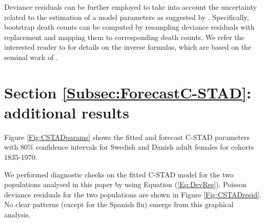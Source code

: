 \documentclass[11pt, a4paper]{article}
\begin{document}
Deviance residuals can be further employed to take into account the uncertainty related to the estimation of a model parameters as suggested by \cite{koissi2006evaluating}. Specifically, bootstrap death counts can be computed by resampling deviance residuals with replacement and mapping them to corresponding death counts. We refer the interested reader to \cite{renshaw2008simulation} for details on the inverse formulas, which are based on the seminal work of \cite{efron1994introduction}.  

\section{Section \ref{Subsec:ForecastC-STAD}: additional results}
\label{Appendix:AdditResults}     

%

Figure \ref{Fig:CSTADparams} shows the fitted and forecast C-STAD parameters with 80\% confidence intervals for Swedish and Danish adult females for cohorts 1835-1970.

We performed diagnostic checks on the fitted C-STAD model for the two populations analysed in this paper by using Equation (\ref{Eq:DevRes}). Poisson deviance residuals for the two populations are shown in Figure \ref{Fig:CSTADresid}. No clear patterns (except for the Spanish flu) emerge from this graphical analysis.
\end{document}
